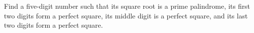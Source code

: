 Find a five-digit number such that its square root is a prime palindrome, its first two digits form a perfect square, its middle digit is a perfect square, and its last two digits form a perfect square.

